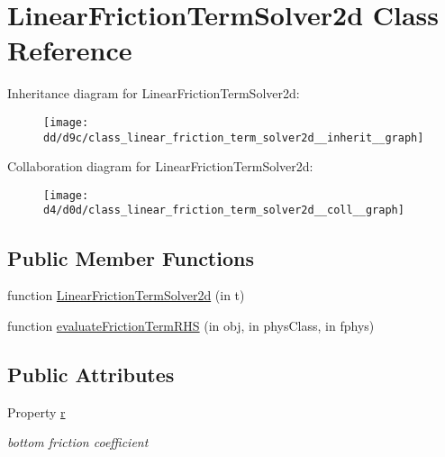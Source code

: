 \hypertarget{class_linear_friction_term_solver2d}{}\section{Linear\+Friction\+Term\+Solver2d Class Reference}
\label{class_linear_friction_term_solver2d}


Inheritance diagram for Linear\+Friction\+Term\+Solver2d\+:
\nopagebreak
\begin{figure}[H]
\begin{center}
\leavevmode
\texttt{[image: dd/d9c/class\_linear\_friction\_term\_solver2d\_\_inherit\_\_graph]}
\end{center}
\end{figure}


Collaboration diagram for Linear\+Friction\+Term\+Solver2d\+:
\nopagebreak
\begin{figure}[H]
\begin{center}
\leavevmode
\texttt{[image: d4/d0d/class\_linear\_friction\_term\_solver2d\_\_coll\_\_graph]}
\end{center}
\end{figure}
\subsection*{Public Member Functions}
\begin{DoxyCompactItemize}
\item 
function \hyperlink{class_linear_friction_term_solver2d_aca639d8bfafbaf11c3f73128d1723b9b}{Linear\+Friction\+Term\+Solver2d} (in t)
\item 
function \hyperlink{class_linear_friction_term_solver2d_a7742af27374007f207003da37e3c3bc0}{evaluate\+Friction\+Term\+R\+HS} (in obj, in phys\+Class, in fphys)
\end{DoxyCompactItemize}
\subsection*{Public Attributes}
\begin{DoxyCompactItemize}
\item 
Property \hyperlink{class_linear_friction_term_solver2d_a35d0fab4e33bea9e3b6b7f6e40224aa5}{r}
\begin{DoxyCompactList}\small\item\em bottom friction coefficient \end{DoxyCompactList}\end{DoxyCompactItemize}


